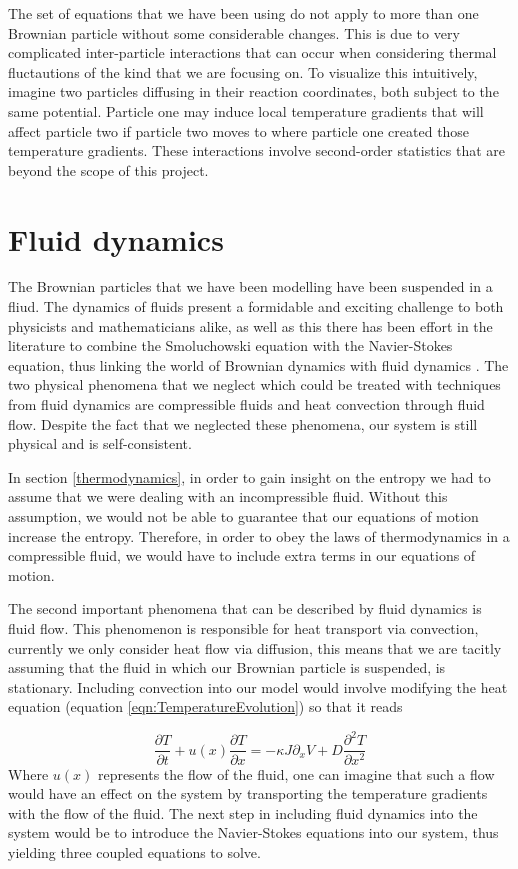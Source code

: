 The set of equations that we have been using do not apply to more than one Brownian particle without some considerable changes. This is due to very complicated inter-particle interactions that can occur when considering thermal fluctautions of the kind that we are focusing on. To visualize this intuitively, imagine two particles diffusing in their reaction coordinates, both subject to the same potential. Particle one may induce local temperature gradients that will affect particle two if particle two moves to where particle one created those temperature gradients. These interactions involve second-order statistics that are beyond the scope of this project.

\section{Fluid dynamics} \label{fluidDynamics}
The Brownian particles that we have been modelling have been suspended in a fliud. The dynamics of fluids present a formidable and exciting challenge to both physicists and mathematicians alike, as well as this there has been effort in the literature to combine the Smoluchowski equation with the Navier-Stokes equation, thus linking the world of Brownian dynamics with fluid dynamics \cite{Constantin2007}. The two physical phenomena that we neglect which could be treated with techniques from fluid dynamics are compressible fluids and heat convection through fluid flow. Despite the fact that we neglected these phenomena, our system is still physical and is self-consistent.

In section \ref{thermodynamics}, in order to gain insight on the entropy we had to assume that we were dealing with an incompressible fluid. Without this assumption, we would not be able to guarantee that our equations of motion
increase the entropy. Therefore, in order to obey the laws of thermodynamics in a compressible fluid, we would have to include extra terms in our equations of motion.

The second important phenomena that can be described by fluid dynamics is fluid flow. This phenomenon is responsible for heat transport via convection, currently we only consider heat flow via diffusion, this means that we are tacitly assuming that the fluid in which our Brownian particle is suspended, is stationary. Including convection into our model would involve modifying the heat equation (equation \ref{eqn:TemperatureEvolution}) so that it reads

\begin{equation}
\frac{\partial T}{\partial t} + u(x) \frac{\partial T}{\partial x} = -\kappa J \partial_x V + D \frac{\partial^2 T}{\partial x^2} 
\end{equation}
Where $u(x)$ represents the flow of the fluid, one can imagine that such a flow would have an effect on the system by transporting the temperature gradients with the flow of the fluid. The next step in including fluid dynamics into the system would be to introduce the Navier-Stokes equations into our system, thus yielding three coupled equations to solve.

